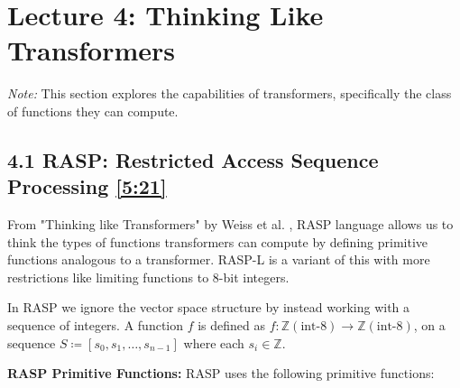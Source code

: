 \documentclass[12pt, twoside]{article}
\begin{document}
\newpage


\thispagestyle{RemoveHeader}


\section*{Lecture 4: Thinking Like Transformers}

\textit{Note:} This section explores the capabilities of transformers, specifically the class of functions they can compute.

\subsection*{4.1 RASP: Restricted Access Sequence Processing
\href{https://youtu.be/2MRAX8EdBA8?si=IgoHB-DrNRVb_ehB&t=321}{[5:21]}}

From "Thinking like Transformers" by Weiss et al. \cite{weiss2021thinking}, RASP language allows us to think the types of functions transformers can compute by defining primitive functions analogous to a transformer. RASP-L is a variant of this with more restrictions like limiting functions to 8-bit integers.

In RASP we ignore the vector space structure by instead working with a sequence of integers. A function $f$ is defined as $f: \mathbb{Z} (\text{int-8}) \to \mathbb{Z} (\text{int-8})$, on a sequence $ S  \coloneqq [s_0,s_1,\dots,s_{n-1}]$ where each $s_i \in \mathbb{Z}$.

\textbf{RASP Primitive Functions:} RASP uses the following primitive functions:
\end{document}
